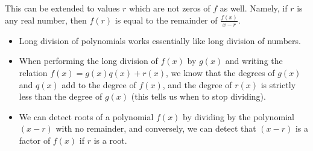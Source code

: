 \documentclass{ximera}
\begin{document}
This can be extended to values $r$ which are not zeros of $f$ as well. Namely, if $r$ is any real number, then $f(r)$ is equal to the remainder of $\frac{f(x)}{x-r}$.


\begin{summary}\begin{itemize}
\item Long division of polynomials works essentially like long division of numbers. 
\item When performing the long division of $f(x)$ by $g(x)$ and writing the relation $f(x) = g(x)q(x)+r(x)$, we know that the degrees of $g(x)$ and $q(x)$ add to the degree of $f(x)$, and the degree of $r(x)$ is strictly less than the degree of $g(x)$ (this tells us when to stop dividing).
\item We can detect roots of a polynomial $f(x)$ by dividing by the polynomial $(x-r)$ with no remainder, and conversely, we can detect that $(x-r)$ is a factor of $f(x)$ if $r$ is a root.
\end{itemize}\end{summary}
\end{document}
